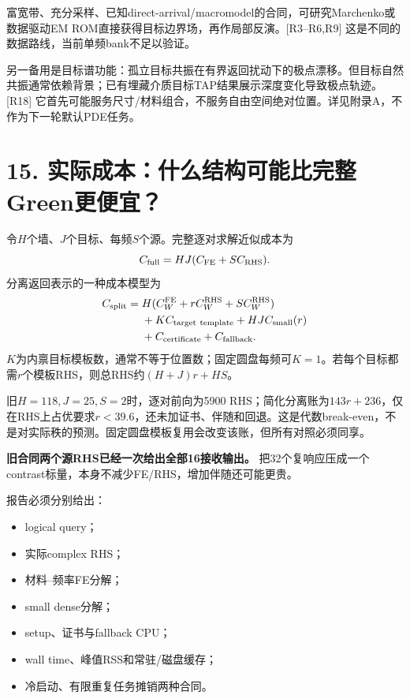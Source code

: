 \documentclass[
  10pt,
  a4paper,
]{article}
\providecommand{\tightlist}{%
  \setlength{\itemsep}{0pt}\setlength{\parskip}{0pt}}
\providecommand{\tightlist}{\setlength{\itemsep}{1pt}\setlength{\parskip}{1pt}}
\begin{document}
富宽带、充分采样、已知direct-arrival/macromodel的合同，可研究Marchenko或数据驱动EM
ROM直接获得目标边界场，再作局部反演。{[}R3--R6,R9{]}
这是不同的数据路线，当前单频bank不足以验证。

另一备用是目标谱功能：孤立目标共振在有界返回扰动下的极点漂移。但目标自然共振通常依赖背景；已有埋藏介质目标TAP结果展示深度变化导致极点轨迹。{[}R18{]}
它首先可能服务尺寸/材料组合，不服务自由空间绝对位置。详见附录A，不作为下一轮默认PDE任务。

\hypertarget{ux5b9eux9645ux6210ux672cux4ec0ux4e48ux7ed3ux6784ux53efux80fdux6bd4ux5b8cux6574greenux66f4ux4fbfux5b9c}{%
\section{15.
实际成本：什么结构可能比完整Green更便宜？}\label{ux5b9eux9645ux6210ux672cux4ec0ux4e48ux7ed3ux6784ux53efux80fdux6bd4ux5b8cux6574greenux66f4ux4fbfux5b9c}}

令\(H\)个墙、\(J\)个目标、每频\(S\)个源。完整逐对求解近似成本为 \[
C_{\rm full}=HJ(C_{\rm FE}+S C_{\rm RHS}).
\] 分离返回表示的一种成本模型为 \[
\begin{aligned}
C_{\rm split}={}&
H(C_W^{\rm FE}+r C_W^{\rm RHS}+S C_W^{\rm RHS})\\
&+K C_{\rm target\ template}
+HJ C_{\rm small}(r)\\
&+C_{\rm certificate}+C_{\rm fallback}.
\end{aligned}
\]
\(K\)为内禀目标模板数，通常不等于位置数；固定圆盘每频可\(K=1\)。若每个目标都需\(r\)个模板RHS，则总RHS约\((H+J)r+HS\)。

旧\(H=118,J=25,S=2\)时，逐对前向为5900
RHS；简化分离账为\(143r+236\)，仅在RHS上占优要求\(r<39.6\)，还未加证书、伴随和回退。这是代数break-even，不是对实际秩的预测。固定圆盘模板复用会改变该账，但所有对照必须同享。

\textbf{旧合同两个源RHS已经一次给出全部16接收输出。}
把32个复响应压成一个contrast标量，本身不减少FE/RHS，增加伴随还可能更贵。

报告必须分别给出：

\begin{itemize}
\tightlist
\item
  logical query；
\item
  实际complex RHS；
\item
  材料--频率FE分解；
\item
  small dense分解；
\item
  setup、证书与fallback CPU；
\item
  wall time、峰值RSS和常驻/磁盘缓存；
\item
  冷启动、有限重复任务摊销两种合同。
\end{itemize}
\end{document}
